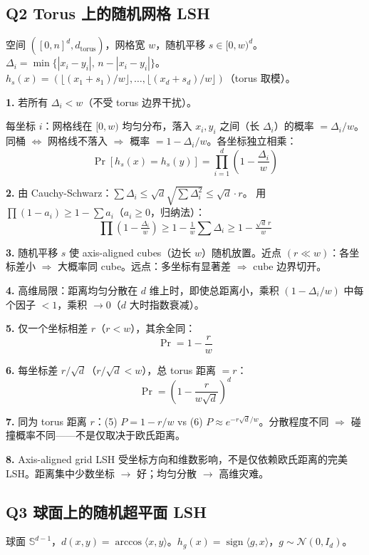 \documentclass[11pt,a4paper]{ctexart}
\newcommand{\inner}[1]{\langle #1 \rangle}
\newcommand{\calN}{\mathcal{N}}
\begin{document}
\subsection*{Q2 \quad Torus 上的随机网格 LSH}

空间 $([0,n]^d, d_{\text{torus}})$，网格宽 $w$，随机平移 $s \in [0,w)^d$。
$\Delta_i = \min\{|x_i-y_i|,\, n-|x_i-y_i|\}$。
$h_s(x) = (\lfloor (x_1+s_1)/w \rfloor, \dots, \lfloor (x_d+s_d)/w \rfloor)$（torus 取模）。

\textbf{1.} 若所有 $\Delta_i < w$（不受 torus 边界干扰）。

每坐标 $i$：网格线在 $[0,w)$ 均匀分布，落入 $x_i,y_i$ 之间（长 $\Delta_i$）的概率 $= \Delta_i/w$。同桶 $\Leftrightarrow$ 网格线不落入 $\Rightarrow$ 概率 $= 1 - \Delta_i/w$。各坐标独立相乘：
\[
\boxed{\Pr[h_s(x)=h_s(y)] = \prod_{i=1}^d \left(1 - \frac{\Delta_i}{w}\right)}
\]

\textbf{2.} 由 Cauchy-Schwarz：$\sum \Delta_i \leq \sqrt{d}\sqrt{\sum \Delta_i^2} \leq \sqrt{d}\cdot r$。
用 $\prod(1-a_i) \geq 1 - \sum a_i$（$a_i\geq 0$，归纳法）：
\[
\prod(1-\tfrac{\Delta_i}{w}) \geq 1 - \tfrac{1}{w}\sum\Delta_i \geq \boxed{1 - \tfrac{\sqrt{d}\,r}{w}}
\]

\textbf{3.} 随机平移 $s$ 使 axis-aligned cubes（边长 $w$）随机放置。近点 $(r \ll w)$：各坐标差小 $\Rightarrow$ 大概率同 cube。远点：多坐标有显著差 $\Rightarrow$ cube 边界切开。

\textbf{4.} 高维局限：距离均匀分散在 $d$ 维上时，即使总距离小，乘积 $(1-\Delta_i/w)$ 中每个因子 $<1$，乘积 $\to 0$（$d$ 大时指数衰减）。

\textbf{5.} 仅一个坐标相差 $r$（$r<w$），其余全同：
\[
\boxed{\Pr = 1 - \frac{r}{w}}
\]

\textbf{6.} 每坐标差 $r/\sqrt{d}$（$r/\sqrt{d}<w$），总 torus 距离 $=r$：
\[
\boxed{\Pr = \left(1 - \frac{r}{w\sqrt{d}}\right)^d}
\]

\textbf{7.} 同为 torus 距离 $r$：(5) $P=1-r/w$ vs (6) $P \approx e^{-r\sqrt{d}/w}$。分散程度不同 $\Rightarrow$ 碰撞概率不同——不是仅取决于欧氏距离。

\textbf{8.} Axis-aligned grid LSH 受坐标方向和维数影响，不是仅依赖欧氏距离的完美 LSH。距离集中少数坐标 $\to$ 好；均匀分散 $\to$ 高维灾难。


\subsection*{Q3 \quad 球面上的随机超平面 LSH}

球面 $\mathbb{S}^{d-1}$，$d(x,y) = \arccos\inner{x,y}$。$h_g(x) = \operatorname{sign}\inner{g,x}$，$g\sim\calN(0,I_d)$。
\end{document}
